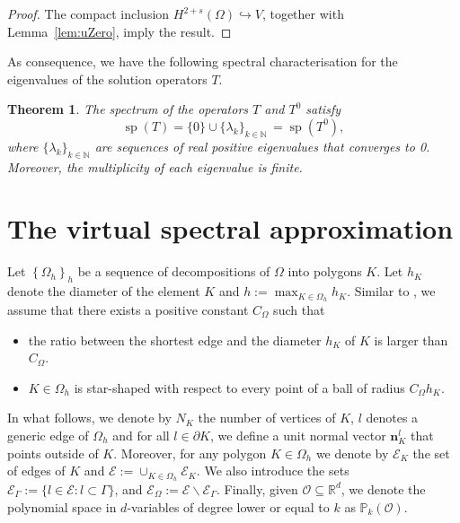 \documentclass[final,reqno]{elsarticle}
\newtheorem{theorem}{Theorem}[section]
\def\E{K}
\def\G{\Gamma}
\def\O{\Omega}
\DeclareMathOperator{\spec}{sp}
\begin{document}
\begin{proof}
The compact inclusion $H^{2+s}(\Omega) \hookrightarrow V$, together with Lemma~\ref{lem:uZero}, imply the result.
\end{proof}

As consequence, we have the following spectral characterisation for the eigenvalues of the solution operators $T$.

\begin{theorem}
The spectrum of the operators $T$ and $T^0$ satisfy
$$
\spec(T)=\{0 \}\cup \{ \lambda_k\}_{k\in \mathbb{N}}\,=\spec(T^0), 
$$
where $\{ \lambda_k\}_{k\in \mathbb{N}}$ are sequences of real positive eigenvalues 
that converges to 0. 
Moreover, the multiplicity of each eigenvalue is finite.
\end{theorem}






\setcounter{equation}{0}
\section{The virtual spectral approximation}
\label{SEC:DISCRETE}

Let $\left\{\Omega_h\right\}_h$ be a sequence of decompositions of $\O$
into polygons $\E$. Let $h_\E$ denote the diameter of the element $\E$
and  
$h:=\max_{\E\in\Omega_h}h_\E$. Similar to \cite{BBCMMR2013}, we  assume that there exists a positive constant $C_{\Omega}$ such that
\begin{itemize}
	\item[{\bf A1}:] the ratio between the shortest edge
	and the diameter $h_\E$ of $\E$ is larger than $C_{\Omega}$.
	\item[{\bf A2}:] $\E\in\Omega_h$ is star-shaped with
	respect to every point of a  ball
	of radius $C_{\Omega}h_\E$.
\end{itemize}

In what follows,
we denote by $N_K$ the number of vertices of $K$,
$l$ denotes a generic edge of $\Omega_h $
and for all $l\in \partial K$, we define a unit normal vector $\boldsymbol{n}_K^l$ 
that points outside of $\E$. Moreover, for any polygon $K\in \Omega_h$ we denote by $\mathcal{E}_K$ the set of edges of $K$ and $\mathcal{E}:=\cup_{K\in \Omega_h}\mathcal{E}_K$. We also introduce the sets $\mathcal{E}_{\G}:=\{l\in \mathcal{E}:l\subset \G \}$, and  $\mathcal{E}_{\O}:= \mathcal{E}\backslash \mathcal{E}_{\G}$. Finally, given $\mathcal{O}\subseteq \mathbb{R}^d$,
we denote the polynomial space in $d$-variables of degree lower or equal to $k$ as $\mathbb{P}_{k}(\mathcal{O})$.
\end{document}
